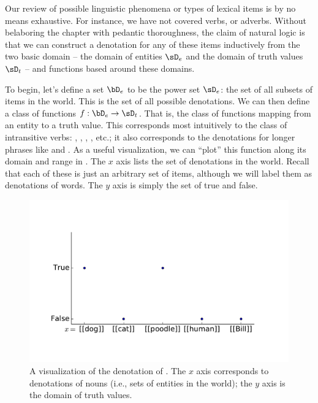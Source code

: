 Our review of possible linguistic phenomena or types of lexical items is by 
  no means exhaustive.
For instance, we have not covered verbs, or adverbs.
Without belaboring the chapter with pedantic thoroughness, the claim of natural logic
  is that we can construct a denotation for any of these items inductively
  from the two basic domain -- 
  the domain of entities $\sD_e$ and the domain of truth values $\sD_t$ --
  and functions based around these domains.

To begin, let's define a set $\bD_e$ to be the power set $\sD_e$: the set of all subsets
  of items in the world.
This is the set of all possible denotations.
We can then define a class of functions $f : \bD_e \rightarrow \sD_t$.
That is, the class of functions mapping from an entity to a truth value.
This corresponds most intuitively to the class of intransitive verbs: ,
  , , , etc.;
  it also corresponds to the denotations for longer phrases like 
  and .
As a useful visualization, we can ``plot'' this function
  along its domain and range in  .
The $x$ axis lists the set of denotations in the world.
Recall that each of these is just an arbitrary set of items, 
  although we will label them as denotations of words.
The $y$ axis is simply the set of true and false.

\begin{figure}[h]
\begin{center}
\includegraphics[height=7cm]{img/denotations_barks.pdf}
\end{center}
\caption{\label{fig:natlog-denotation-barks}
  A visualization of the denotation of . The $x$ axis corresponds to denotations
  of nouns (i.e., sets of entities in the world); the $y$ axis is the domain of truth values.
}
\end{figure}

